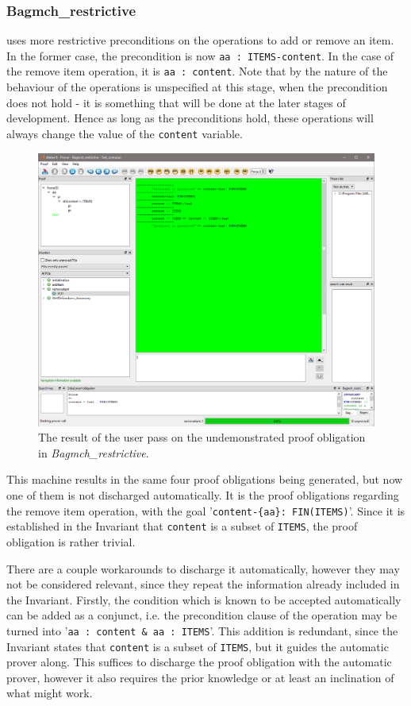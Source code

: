 \documentclass[12pt,journal,duplex]{IEEEtran}
\begin{document}
	\subsubsection{Bagmch\_restrictive} uses more restrictive preconditions on the operations to add or remove an item. In the former case, the precondition is now \texttt{aa : ITEMS-content}. In the case of the remove item operation, it is \texttt{aa : content}. Note that by the nature of the behaviour of the operations is unspecified at this stage, when the precondition does not hold - it is something that will be done at the later stages of development. Hence as long as the preconditions hold, these operations will always change the value of the \texttt{content} variable.
		\begin{figure}
		\centering
		\includegraphics[scale=0.5]{bagmch_restrictive_ip.png}
		\caption{The result of the user pass on the undemonstrated proof obligation in  \emph{Bagmch\_restrictive}.}

	\end{figure}
	This machine results in the same four proof obligations being generated, but now one of them is not discharged automatically. It is the proof obligations regarding the remove item operation, with the goal '\texttt{content-\{aa\}: FIN(ITEMS)}'. Since it is established in the Invariant that \texttt{content} is a subset of \texttt{ITEMS}, the proof obligation is rather trivial.

	There are a couple workarounds to discharge it automatically, however they may not be considered relevant, since they repeat the information already included in the Invariant. Firstly, the condition which is known to be accepted automatically can be added as a conjunct, i.e. the precondition clause of the operation may be turned into '\texttt{aa : content \& aa : ITEMS}'. This addition is redundant, since the Invariant states that \texttt{content} is a subset of \texttt{ITEMS}, but it guides the automatic prover along. This suffices to discharge the proof obligation with the automatic prover, however it also requires the prior knowledge or at least an inclination of what might work.
\end{document}
